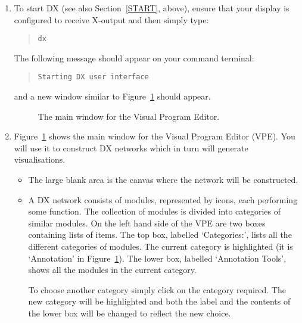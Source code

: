 \documentclass[twoside,11pt]{article}
\begin{document}
\begin{enumerate}

  \item To start DX (see also Section~\ref{START}, above), ensure that
   your display is configured to receive X-output and then simply type:

  \begin{quote}
   {\tt dx}
  \end{quote}

   The following message should appear on your command terminal:

  \begin{quote}
   {\tt Starting DX user interface}
  \end{quote}

   and a new window similar to Figure~\ref{VPE} should appear.

  \begin{figure}[htbp]
  \label{VPE}

  \begin{center}
  \leavevmode
  \epsfxsize=450pt
  \end{center}

  \caption[The main window for the Visual Program Editor.]{The main
   window for the Visual Program Editor.}

  \end{figure}

  \item Figure~\ref{VPE} shows the main window for the Visual Program
   Editor (VPE). You will use it to construct DX networks which in turn
   will generate visualisations.

  \begin{itemize}

    \item The large blank area is the canvas where the network will be
     constructed.

    \item A DX network consists of modules, represented by icons, each
     performing some function. The collection of modules is divided
     into categories of similar modules. On the left hand side of the
     VPE are two boxes containing lists of items. The top box, labelled
     `Categories:', lists all the different categories of modules. The
     current category is highlighted (it is `Annotation' in
     Figure~\ref{VPE}). The lower box, labelled `Annotation Tools',
     shows all the modules in the current category.

     To choose another category simply click on the category required.
     The new category will be highlighted and both the label and the
     contents of the lower box will be changed to reflect the new
     choice.


\end{itemize}
\end{enumerate}
\end{document}

